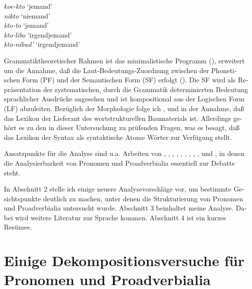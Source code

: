 \documentclass[output=paper, colorlinks, citecolor=brown, booklanguage=german]{langscibook}
\begin{document}
\begin{otherlanguage}{german}
\ea\label{ex:02:k-partikeln}
   \textit{koe-kto} `jemand' \\
   \textit{nikto} `niemand'\\
   \textit{kto-to} `jemand' \\
   \textit{kto-libo} `irgendjemand'\\
   \textit{kto-nibud'} `irgendjemand'\\
\z

\noindent Grammatiktheoretischer Rahmen ist das minimalistische Programm (\citealt{zi02:Chomsky1995,zi02:Chomsky1995,Chomsky1998,Chomsky1999}), erweitert um die Annahme, daß die Laut-Bedeutungs-Zu\-ord\-nung zwischen der Phonetischen Form (PF) und der Semantischen Form (SF) erfolgt (\citealt{Bierwisch1987,zi02:Bierwisch1997}). Die SF wird als Repräsentation der syste\-ma\-tischen, durch die Grammatik determinierten Bedeutung sprachlicher Ausdrücke angesehen und ist kompositional aus der Logischen Form (LF) abzuleiten. Bezüglich der Morphologie folge ich \citet{Stiebels.Wunderlich1994}, \citet{Wunderlich.Fabri1995} und \citet{Wunderlich1997a} in der Annahme, daß das Lexikon der Lieferant des wortstrukturellen Baumaterials ist. Allerdings gehört es zu den in dieser Untersuchung zu prüfenden Fragen, was es besagt, daß das Lexikon der Syntax als syntaktische Atome Wörter zur Verfügung stellt.

Ansatzpunkte für die Analyse sind u.a. Arbeiten von \citet{Katz.Postal1964}, \citet{Klima1964}, \citet{Postal1969}, \citet{Steinitz.Lang1969}, \citet{Zwarts1992}, \citet{Lenerz1993}, \citet{Cardinaletti1994}, \citet{Cardinaletti.Starke1995}, \citet{Rauh1995}, \citet{Acquaviva1995} und \citet{Tsai1999}, in denen die Analysierbarkeit von Pronomen und Proadverbialia essentiell zur Debatte steht.

In Abschnitt 2 stelle ich einige neuere Analysevorschläge vor, um bestimmte Gesichtspunkte deutlich zu machen, unter denen die Strukturierung von Pronomen und Proadverbialia untersucht wurde. Abschnitt 3 beinhaltet meine Analyse. Dabei wird weitere Literatur zur Sprache kommen. Abschnitt 4 ist ein kurzes Resümee.

\section{Einige Dekompositionsversuche für Pronomen und Proadverbialia} \label{dekompositionsversuche}


\end{otherlanguage}
\end{document}
